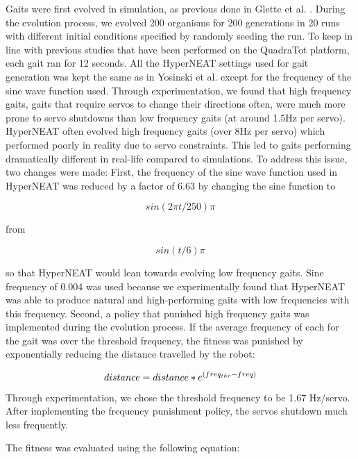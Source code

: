 Gaits were first evolved in simulation, as previous done in Glette et al. \cite{glette}. 
During the evolution process, we evolved 200 organisms for 200 generations in 20 runs with different initial conditions specified by randomly seeding the run. 
To keep in line with previous studies that have been performed on the QuadraTot platform, each gait ran for 12 seconds. 
All the HyperNEAT settings used for gait generation was kept the same as in Yosinski et al. \cite{yos:clune} except for the frequency of the sine wave function used. 
Through experimentation, we found that high frequency gaits, gaits that require servos to change their directions often, were much more prone to servo shutdowns than low frequency gaits (at around 1.5Hz per servo). 
HyperNEAT often evolved high frequency gaits (over 8Hz per servo) which performed poorly in reality due to servo constraints. 
This led to gaits performing dramatically different in real-life compared to simulations. 
To address this issue, two changes were made:
First, the frequency of the sine wave function used in HyperNEAT was reduced by a factor of 6.63 by changing the sine function to

\begin{equation}
sin(2\pi t/250)\pi
\end{equation}

from

\begin{equation}
sin(t/6)\pi
\end{equation}


so that HyperNEAT would lean towards evolving low frequency gaits. Sine frequency of 0.004  was used because we experimentally found that HyperNEAT was able to produce natural and high-performing gaits with low frequencies with this frequency. 
Second, a policy that punished high frequency gaits was implemented during the evolution process. 
If the average frequency of each for the gait was over the threshold frequency, the fitness was punished by exponentially reducing the distance travelled by the robot:

\begin{equation}
distance = distance*e^{(freq_{thr}-freq)} \\
\end{equation}

Through experimentation, we chose the threshold frequency to be 1.67 Hz/servo. After implementing the frequency punishment policy, the servos shutdown much less frequently. 


The fitness was evaluated using the following equation:

